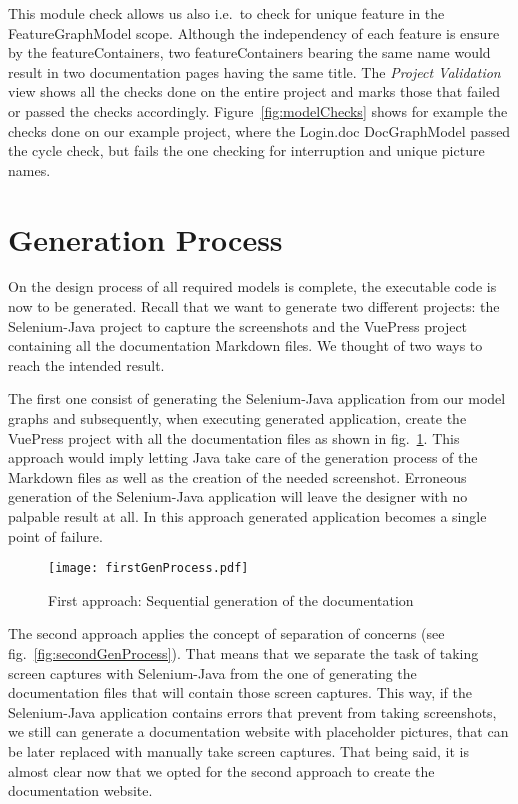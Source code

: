 This module check allows us also i.e.~to check for unique feature in the FeatureGraphModel scope. Although the independency of each feature is ensure by the featureContainers, two featureContainers bearing the same name would result in two documentation pages having the same title. The \textit{Project Validation} view shows all the checks done on the entire project and marks those that failed or passed the checks accordingly. Figure~\ref{fig:modelChecks} shows for example the checks done on our example project, where the Login.doc DocGraphModel passed the cycle check, but fails the one checking for interruption and unique picture names.

\section{Generation Process}\label{sec:GenProcess}

On the design process of all required models is complete, the executable code is now to be generated. Recall that we want to generate two different projects: the Selenium-Java project to capture the screenshots and the VuePress project containing all the documentation Markdown files. We thought of two ways to reach the intended result.

The first one consist of generating the Selenium-Java application from our model graphs and subsequently, when executing generated application, create the VuePress project with all the documentation files as shown in fig.~\ref{fig:firstGenProcess}. This approach would imply letting Java take care of the generation process of the Markdown files as well as the creation of the needed screenshot. Erroneous generation of the Selenium-Java application will leave the designer with no palpable result at all. In this approach generated application becomes a single point of failure.

\begin{figure}[h]
    \centering
    \texttt{[image: firstGenProcess.pdf]}
    \caption{First approach: Sequential generation of the documentation}
    \label{fig:firstGenProcess}
\end{figure}

The second approach applies the concept of separation of concerns (see fig.~\ref{fig:secondGenProcess}). That means that we separate the task of taking screen captures with Selenium-Java from the one of generating the documentation files that will contain those screen captures. This way, if the Selenium-Java application contains errors that prevent from taking screenshots, we still can generate a documentation website with placeholder pictures, that can be later replaced with manually take screen captures. That being said, it is almost clear now that we opted for the second approach to create the documentation website.

